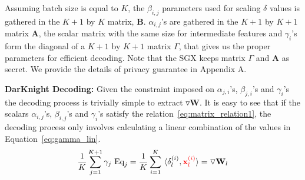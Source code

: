 Assuming batch size is equal to $K$, the $\beta_{i,j}$ parameters used for scaling $\delta$ values is gathered in the $K+1$ by $K$ matrix, $\mathbf B$. $\alpha_{i,j}$'s are gathered in the $K+1$ by $K+1$ matrix $\mathbf A$, the scalar matrix with the same size for intermediate features and $\gamma_i$'s form the diagonal of a $K+1$ by $K+1$ matrix $\Gamma$, that gives us the proper parameters for efficient decoding. Note that the SGX keeps matrix $\Gamma$ and $\mathbf A$ as secret. We provide the details of privacy guarantee in Appendix A.

\textbf{DarKnight Decoding:} Given the constraint imposed on $\alpha_{j,i}$'s, $\beta_{j,i}$'s and $\gamma_i$'s the decoding process is trivially simple to extract $\triangledown \mathbf{W}$. It is easy to see that if the scalars $\alpha_{i,j}$'s, $\beta_{i,j}$'s and $\gamma_i$'s satisfy the relation~\eqref{eq:matrix_relation1}, the decoding process only involves calculating a linear combination of the values in Equation~\eqref{eq:gamma_lin}.
\begin{align}
    \frac 1 K\sum_{j=1}^{K+1}  \gamma_{j} ~ \text{Eq}_{j}=\frac 1 K \sum_{i=1}^K ~ \langle \delta^{(i)}_{l} , {\color{red}\mathbf x^{(i)}_{l}}\rangle=\triangledown \mathbf{W}_l
\end{align} 




